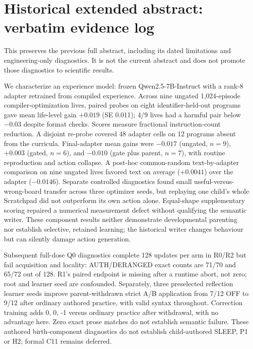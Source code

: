 \documentclass{article}
\begin{document}
\section*{Historical extended abstract: verbatim evidence log}
\noindent This preserves the previous full abstract, including its dated
limitations and engineering-only diagnostics. It is not the current abstract
and does not promote those diagnostics to scientific results.

We characterize an experience model: frozen Qwen2.5-7B-Instruct with a rank-8 adapter retrained from compiled experience. Across nine ungated 1{,}024-episode compiler-optimization lives, paired probes on eight identifier-held-out programs gave mean life-level gain $+0.019$ (SE 0.011); 4/9 lives had a harmful pair below $-0.03$ despite format checks. Scores measure fractional instruction-count reduction. A disjoint re-probe covered 48 adapter cells on 12 programs absent from the curricula. Final-adapter mean gains were $-0.017$ (ungated, $n=9$), $+0.003$ (gated, $n=6$), and $-0.010$ (gate plus parent, $n=7$), with routine reproduction and action collapse. A post-hoc common-random text-by-adapter comparison on nine ungated lives favored text on average ($+0.0041$) over the adapter ($-0.0146$). Separate controlled diagnostics found small useful-versus-wrong-board transfer across three optimizer seeds, but replaying one child's whole Scratchpad did not outperform its own action alone. Equal-shape supplementary scoring repaired a numerical measurement defect without qualifying the semantic writer. These component results neither demonstrate developmental parenting nor establish selective, retained learning; the historical writer changes behaviour but can silently damage action generation.

Subsequent full-dose Q0 diagnostics complete 128 updates per arm in R0/R2 but
fail acquisition and locality: AUTH/DERANGED exact counts are 71/70 and 65/72
out of 128. R1's paired endpoint is missing after a runtime abort, not zero;
root and learner seed are confounded. Separately, three preselected reflection
learner seeds improve parent-withdrawn strict A/B application from 7/12 OFF to 9/12
after ordinary authored practice, with valid syntax throughout. Correction
training adds 0, 0, -1 versus ordinary practice after withdrawal, with no advantage
here. Zero exact prose matches do not establish semantic failure. These authored
birth-component diagnostics do not establish child-authored SLEEP, P1 or H2;
formal C11 remains deferred.
\end{document}
